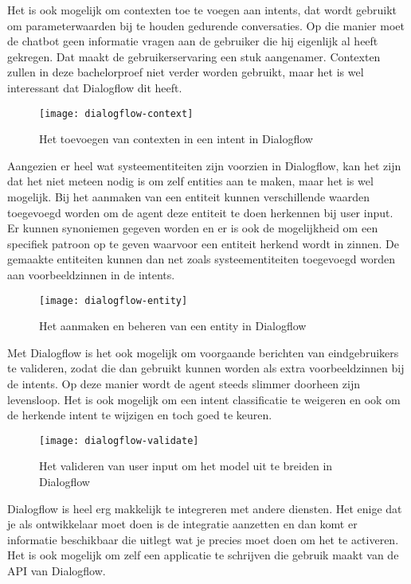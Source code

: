 Het is ook mogelijk om contexten toe te voegen aan intents, dat wordt gebruikt om parameterwaarden bij te houden gedurende conversaties. Op die manier moet de chatbot geen informatie vragen aan de gebruiker die hij eigenlijk al heeft gekregen. Dat maakt de gebruikerservaring een stuk aangenamer. Contexten zullen in deze bachelorproef niet verder worden gebruikt, maar het is wel interessant dat Dialogflow dit heeft.

\begin{figure}[H]
    \label{fig:dialogflow-context}
    \centering
    \texttt{[image: dialogflow-context]}
    \caption{Het toevoegen van contexten in een intent in Dialogflow}
\end{figure}

Aangezien er heel wat systeementiteiten zijn voorzien in Dialogflow, kan het zijn dat het niet meteen nodig is om zelf entities aan te maken, maar het is wel mogelijk. Bij het aanmaken van een entiteit kunnen verschillende waarden toegevoegd worden om de agent deze entiteit te doen herkennen bij user input. Er kunnen synoniemen gegeven worden en er is ook de mogelijkheid om een specifiek patroon op te geven waarvoor een entiteit herkend wordt in zinnen. De gemaakte entiteiten kunnen dan net zoals systeementiteiten toegevoegd worden aan voorbeeldzinnen in de intents.

\begin{figure}[H]
    \label{fig:dialogflow-entity}
    \centering
    \texttt{[image: dialogflow-entity]}
    \caption{Het aanmaken en beheren van een entity in Dialogflow}
\end{figure}

Met Dialogflow is het ook mogelijk om voorgaande berichten van eindgebruikers te valideren, zodat die dan gebruikt kunnen worden als extra voorbeeldzinnen bij de intents. Op deze manier wordt de agent steeds slimmer doorheen zijn levensloop. Het is ook mogelijk om een intent classificatie te weigeren en ook om de herkende intent te wijzigen en toch goed te keuren. 

\begin{figure}[H]
    \label{fig:dialogflow-validate}
    \centering
    \texttt{[image: dialogflow-validate]}
    \caption{Het valideren van user input om het model uit te breiden in Dialogflow}
\end{figure}

Dialogflow is heel erg makkelijk te integreren met andere diensten. Het enige dat je als ontwikkelaar moet doen is de integratie aanzetten en dan komt er informatie beschikbaar die uitlegt wat je precies moet doen om het te activeren. Het is ook mogelijk om zelf een applicatie te schrijven die gebruik maakt van de API van Dialogflow.

